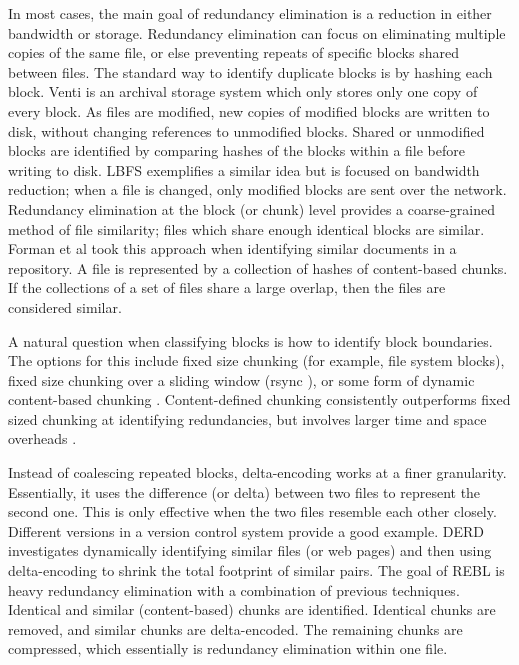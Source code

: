 \documentclass[10pt, twocolumn]{article}
\begin{document}
In most cases, the main goal of redundancy elimination is a reduction in either bandwidth or storage. Redundancy elimination  can focus on eliminating multiple copies of the same file, or else preventing repeats of specific blocks shared between files. The standard way to identify duplicate blocks is by hashing each block. Venti \cite{venti} is an archival storage system which only stores only one copy of every block. As files are modified, new copies of modified blocks are written to disk, without changing references to unmodified blocks. Shared or unmodified blocks are identified by comparing hashes of the blocks within a file before writing to disk. LBFS \cite{lbfs} exemplifies a similar idea but is focused on bandwidth reduction; when a file is changed, only modified blocks are sent over the network. Redundancy elimination at the block (or chunk) level provides a coarse-grained method of file similarity; files which share enough identical blocks are similar. Forman et al\cite{hpDocRepositories} took this approach when identifying similar documents in a repository. A file is represented by a collection of hashes of content-based chunks. If the collections of a set of files share a large overlap, then the files are considered similar.

A natural question when classifying blocks is how to identify block boundaries. The options for this include fixed size chunking (for example, file system blocks), fixed size chunking over a sliding window (rsync \cite{rsync}), or some form of dynamic content-based chunking \cite{lbfs}. Content-defined chunking consistently outperforms fixed sized chunking at identifying redundancies, but involves larger time and space overheads  \cite{policroniades2004adr}.

Instead of coalescing repeated blocks, delta-encoding works at a finer granularity. Essentially, it uses the difference (or delta) between two files to represent the second one. This is only effective when the two files resemble each other closely.  Different versions in a version control system provide a good example. DERD \cite{derd} investigates dynamically identifying similar files (or web pages) and then using delta-encoding to shrink the total footprint of similar pairs. The goal of REBL \cite{rebl} is heavy redundancy elimination with a combination of previous techniques. Identical and similar (content-based) chunks are identified. Identical chunks are removed, and similar chunks are delta-encoded. The remaining chunks are compressed, which essentially is redundancy elimination within one file.
\end{document}
